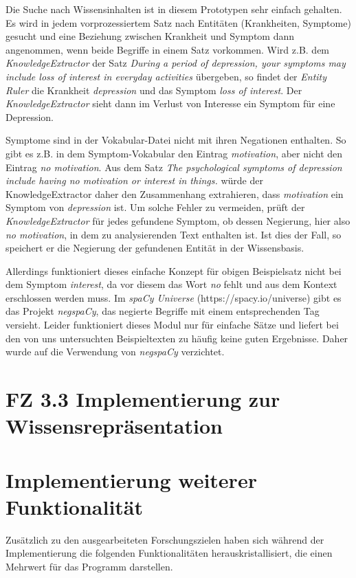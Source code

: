 Die Suche nach Wissensinhalten ist in diesem Prototypen sehr einfach gehalten. Es wird in jedem vorprozessiertem Satz nach Entitäten (Krankheiten, Symptome) gesucht und eine Beziehung zwischen Krankheit und Symptom dann angenommen, wenn beide Begriffe in einem Satz vorkommen. Wird z.B. dem \emph{KnowledgeExtractor} der Satz \emph{\glqq During a period of depression, your symptoms may include loss of interest in everyday activities\flqq} übergeben, so findet der \emph{Entity Ruler} die Krankheit \emph{depression} und das Symptom \emph{loss of interest}. Der \emph{KnowledgeExtractor} sieht dann im Verlust von Interesse ein Symptom für eine Depression.

Symptome sind in der Vokabular-Datei nicht mit ihren Negationen enthalten. So gibt es z.B. in dem Symptom-Vokabular den Eintrag \emph{motivation}, aber nicht den Eintrag \emph{no motivation}. Aus dem Satz \emph{\glqq The psychological symptoms of depression include having no motivation or interest in things.\flqq} würde der KnowledgeExtractor daher den Zusammenhang extrahieren, dass \emph{motivation} ein Symptom von \emph{depression} ist. Um solche Fehler zu vermeiden, prüft der \emph{KnowledgeExtractor} für jedes gefundene Symptom, ob dessen Negierung, hier also \emph{no motivation}, in dem zu analysierenden Text enthalten ist. Ist dies der Fall, so speichert er die Negierung der gefundenen Entität in der Wissensbasis.

Allerdings funktioniert dieses einfache Konzept für obigen Beispielsatz nicht bei dem Symptom \emph{interest}, da vor diesem das Wort \emph{no} fehlt und aus dem Kontext erschlossen werden muss. Im \emph{spaCy Universe} (https://spacy.io/universe) gibt es das Projekt \emph{negspaCy}, das negierte Begriffe mit einem entsprechenden Tag versieht. Leider funktioniert dieses Modul nur für einfache Sätze und liefert bei den von uns untersuchten Beispieltexten zu häufig keine guten Ergebnisse. Daher wurde auf die Verwendung von \emph{negspaCy} verzichtet.

\section{FZ 3.3 Implementierung zur Wissensrepräsentation}
\label{sec:FZ3.3} 

\section{Implementierung weiterer Funktionalität}

Zusätzlich zu den ausgearbeiteten Forschungszielen haben sich während der Implementierung die folgenden Funktionalitäten herauskristallisiert, die einen Mehrwert für das Programm darstellen.

